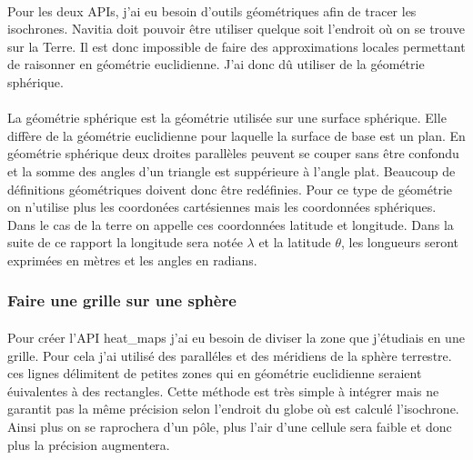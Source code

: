 \documentclass[a4paper]{report}
\begin{document}
\paragraph{} Pour les deux APIs, j'ai eu besoin d'outils géométriques afin de tracer les isochrones. Navitia doit pouvoir être utiliser quelque soit l'endroit où on se trouve sur la Terre. Il est donc impossible de faire des approximations locales permettant de raisonner en géométrie euclidienne. J'ai donc dû utiliser de la géométrie sphérique.

\paragraph{} La géométrie sphérique est la géométrie utilisée sur une surface sphérique. Elle diffère de la géométrie euclidienne pour laquelle la surface de base est un plan. En géométrie sphérique deux droites parallèles peuvent se couper sans être confondu et la somme des angles d'un triangle est suppérieure à l'angle plat. Beaucoup de définitions géométriques doivent donc être redéfinies. Pour ce type de géométrie on n'utilise plus les coordonées cartésiennes mais les coordonnées sphériques. Dans le cas de la terre on appelle ces coordonnées latitude et longitude. Dans la suite de ce rapport la longitude sera notée $\lambda$ et la latitude $\theta$, les longueurs seront exprimées en mètres et les angles en radians.

\subsubsection{Faire une grille sur une sphère}

\paragraph{} Pour créer l'API heat\_maps j'ai eu besoin de diviser la zone que j'étudiais en une grille. Pour cela j'ai utilisé des paralléles et des méridiens de la sphère terrestre. ces lignes délimitent de petites zones qui en géométrie euclidienne seraient éuivalentes à des rectangles. Cette méthode est très simple à intégrer mais ne garantit pas la même précision selon l'endroit du globe où est calculé l'isochrone. Ainsi plus on se raprochera d'un pôle, plus l'air d'une cellule sera faible et donc plus la précision augmentera.
\end{document}
